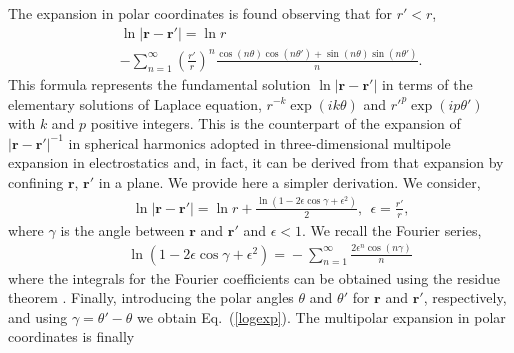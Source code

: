 The expansion in polar coordinates is found observing that for $r'<r$,
\begin{eqnarray}&&
\ln |\bm r-\bm r'|=\ln r\nonumber\\&&
-\sum_{n=1}^{\infty}\left(\frac{r'}{r}\right)^n\frac{\cos(n\theta)\cos(n\theta')+\sin(n\theta)\sin(n\theta')}{n}. \label{logexp}
\end{eqnarray}
This formula represents the fundamental solution $\ln |\bm r-\bm r'|$ in terms of the elementary solutions of Laplace equation, $r^{-k}\exp(ik\theta)$ and $r'^p\exp(ip\theta')$ with  $k$ and $p$ positive integers.
This is the counterpart of the expansion of $|\bm r-\bm r'|^{-1}$ in spherical harmonics adopted in three-dimensional multipole expansion in electrostatics \citep{cl} and, in fact, it can be derived from
that expansion by confining $\bm r$, $\bm r'$ in a plane. We provide here a simpler derivation. We consider,
\begin{eqnarray}&&\!\!\!\!\!\!
\ln |\bm r-\bm r'|=\ln r+\frac{\ln\left(1-2\epsilon\cos\gamma+\epsilon^2\right)}{2},\ \ \epsilon=\frac{r'}{r},
\end{eqnarray}
where $\gamma$ is the angle between $\bm r$ and $\bm r'$ and $\epsilon<1$. We recall the Fourier series,
\begin{eqnarray}&&
\ln\left(1\!-\!2\epsilon\cos\gamma\!+\!\epsilon^2\right)\!=\! -\sum_{n=1}^{\infty}\frac{2\epsilon^n \cos(n\gamma)}{n}\,%
\end{eqnarray}
where the integrals for the Fourier coefficients can be obtained using the residue theorem \citep{grad}.
Finally, introducing the polar angles $\theta$ and $\theta'$ for $\bm r$ and $\bm r'$, respectively, and using $\gamma=\theta'-\theta$ we obtain Eq.~(\ref{logexp}).
The multipolar expansion in polar coordinates is finally
